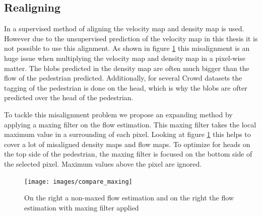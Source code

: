 \subsection{Realigning}
In \cite{leibe_crossing-line_2016} a supervised method of aligning the velocity map and density map is used. However due to the unsupervised prediction of the velocity map in this thesis it is not possible to use this alignment. As shown in figure \ref{fig:maxing} this misalignment is an huge issue when multiplying the velocity map and density map in a pixel-wise matter. The blobs predicted in the density map are often much bigger than the flow of the pedestrian predicted. Additionally, for several Crowd datasets the tagging of the pedestrian is done on the head, which is why the blobs are ofter predicted over the head of the pedestrian.

To tackle this misalignment problem we propose an expanding method by applying a maxing filter on the flow estimation. This maxing filter takes the local maximum value in a surrounding of each pixel. Looking at figure \ref{fig:maxing} this helps to cover a lot of misaligned density maps and flow maps. To optimize for heads on the top side of the pedestrian, the maxing filter is focused on the bottom side of the selected pixel. Maximum values above the pixel are ignored.

\begin{figure}[h]
\centering
\texttt{[image: images/compare\_maxing]}
\caption{On the right a non-maxed flow estimation and on the right the flow estimation with maxing filter applied}
\label{fig:maxing}
\end{figure}
